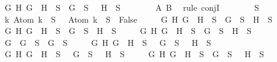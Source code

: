 \begin{isabellebody}
\ \ \ \ {\isasymand}\ {\isacharparenleft}{\isasymforall}G\ H{\isachardot}\ \isactrlbold {\isasymnot}{\isacharparenleft}G\ \isactrlbold {\isasymrightarrow}\ H{\isacharparenright}\ {\isasymin}\ S\ {\isasymlongrightarrow}\ G\ {\isasymin}\ S\ {\isasymand}\ \isactrlbold {\isasymnot}\ H\ {\isasymin}\ S{\isacharparenright}{\isacharparenright}{\isachardoublequoteclose}\isanewline
\ \ \ \ \ \ \isamarkupfalse%
\ A\ B\ \isamarkupfalse%
\ {\isacharparenleft}rule\ conjI{\isacharparenright}\isanewline
\ \ \ \ \isamarkupfalse%
\ {\isachardoublequoteopen}{\isasymbottom}\ {\isasymnotin}\ S\isanewline
\ \ \ \ {\isasymand}\ {\isacharparenleft}{\isasymforall}k{\isachardot}\ Atom\ k\ {\isasymin}\ S\ {\isasymlongrightarrow}\ \isactrlbold {\isasymnot}\ {\isacharparenleft}Atom\ k{\isacharparenright}\ {\isasymin}\ S\ {\isasymlongrightarrow}\ False{\isacharparenright}\isanewline
\ \ \ \ {\isasymand}\ {\isacharparenleft}{\isasymforall}G\ H{\isachardot}\ G\ \isactrlbold {\isasymand}\ H\ {\isasymin}\ S\ {\isasymlongrightarrow}\ G\ {\isasymin}\ S\ {\isasymand}\ H\ {\isasymin}\ S{\isacharparenright}\isanewline
\ \ \ \ {\isasymand}\ {\isacharparenleft}{\isasymforall}G\ H{\isachardot}\ G\ \isactrlbold {\isasymor}\ H\ {\isasymin}\ S\ {\isasymlongrightarrow}\ G\ {\isasymin}\ S\ {\isasymor}\ H\ {\isasymin}\ S{\isacharparenright}\isanewline
\ \ \ \ {\isasymand}\ {\isacharparenleft}{\isasymforall}G\ H{\isachardot}\ G\ \isactrlbold {\isasymrightarrow}\ H\ {\isasymin}\ S\ {\isasymlongrightarrow}\ \isactrlbold {\isasymnot}G\ {\isasymin}\ S\ {\isasymor}\ H\ {\isasymin}\ S{\isacharparenright}\isanewline
\ \ \ \ {\isasymand}\ {\isacharparenleft}{\isasymforall}G{\isachardot}\ \isactrlbold {\isasymnot}\ {\isacharparenleft}\isactrlbold {\isasymnot}G{\isacharparenright}\ {\isasymin}\ S\ {\isasymlongrightarrow}\ G\ {\isasymin}\ S{\isacharparenright}\isanewline
\ \ \ \ {\isasymand}\ {\isacharparenleft}{\isasymforall}G\ H{\isachardot}\ \isactrlbold {\isasymnot}{\isacharparenleft}G\ \isactrlbold {\isasymand}\ H{\isacharparenright}\ {\isasymin}\ S\ {\isasymlongrightarrow}\ \isactrlbold {\isasymnot}\ G\ {\isasymin}\ S\ {\isasymor}\ \isactrlbold {\isasymnot}\ H\ {\isasymin}\ S{\isacharparenright}\isanewline
\ \ \ \ {\isasymand}\ {\isacharparenleft}{\isasymforall}G\ H{\isachardot}\ \isactrlbold {\isasymnot}{\isacharparenleft}G\ \isactrlbold {\isasymor}\ H{\isacharparenright}\ {\isasymin}\ S\ {\isasymlongrightarrow}\ \isactrlbold {\isasymnot}\ G\ {\isasymin}\ S\ {\isasymand}\ \isactrlbold {\isasymnot}\ H\ {\isasymin}\ S{\isacharparenright}\isanewline
\ \ \ \ {\isasymand}\ {\isacharparenleft}{\isasymforall}G\ H{\isachardot}\ \isactrlbold {\isasymnot}{\isacharparenleft}G\ \isactrlbold {\isasymrightarrow}\ H{\isacharparenright}\ {\isasymin}\ S\ {\isasymlongrightarrow}\ G\ {\isasymin}\ S\ {\isasymand}\ \isactrlbold {\isasymnot}\ H\ {\isasymin}\ S{\isacharparenright}{\isachardoublequoteclose}\ \isanewline

\end{isabellebody}
